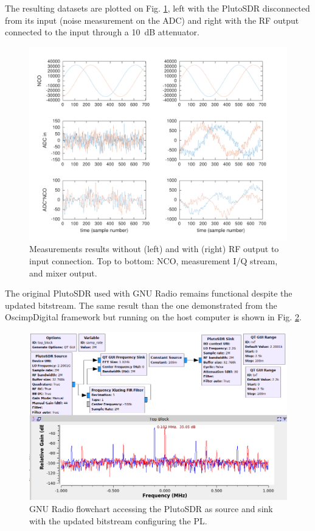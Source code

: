 \documentclass[12pt,oneside]{article}
\begin{document}
The resulting datasets are plotted on Fig. \ref{openclosed}, left with the
PlutoSDR disconnected from its input (noise measurement on the ADC) and right with
the RF output connected to the input through a 10~dB attenuator.

\begin{figure}[h!tb]
\includegraphics[width=\linewidth]{all_mixer.pdf}
\caption{Measurements results without (left) and with (right) RF output to input
connection. Top to bottom: NCO, measurement I/Q stream, and mixer output.}
\label{openclosed}
\end{figure}

The original PlutoSDR used with GNU Radio remains functional despite the updated bitstream.
The same result than the one demonstrated from the OscimpDigital framework but running on the
host computer is shown in Fig. \ref{gnuradio}.

\begin{figure}[h!tb]
\includegraphics[width=\linewidth]{gnuradio.png}
\caption{GNU Radio flowchart accessing the PlutoSDR as source and sink with the updated
bitstream configuring the PL.}
\label{gnuradio}
\end{figure}
\end{document}
